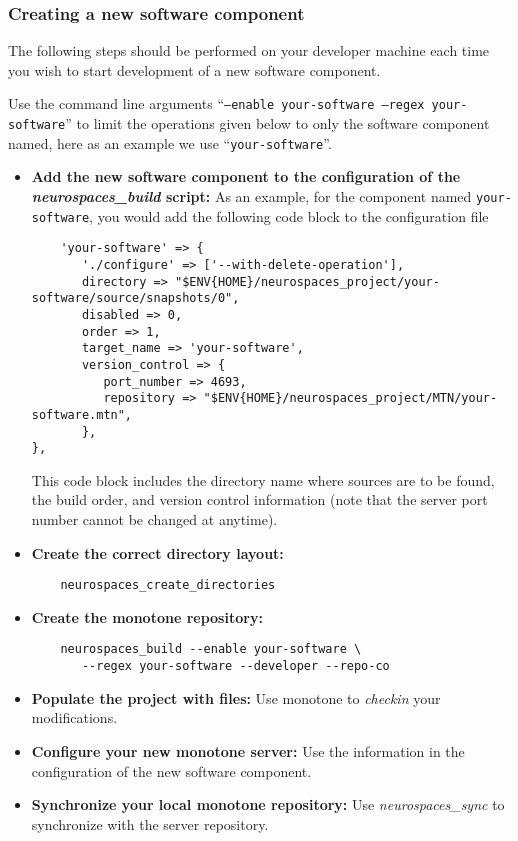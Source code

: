 \documentclass[12pt]{article}
\begin{document}
\subsubsection*{Creating a new software component}

The following steps should be performed on your developer machine each time you wish to start development of a new software component.

Use the command line arguments ``{\tt --enable your-software --regex your-software}'' to limit the operations given below to only the software component named, here as an example we use ``{\tt your-software}''. 

\begin{itemize}
	\item {\bf Add the new software component to the configuration of the {\it neurospaces\_build} script:} As an example, for the component named {\tt your-software}, you would add the following code block to the configuration file
	\begin{footnotesize}
	\begin{verbatim}
	'your-software' => {
	   './configure' => ['--with-delete-operation'],
	   directory => "$ENV{HOME}/neurospaces_project/your-software/source/snapshots/0",
	   disabled => 0,
	   order => 1,
	   target_name => 'your-software',
	   version_control => {
	      port_number => 4693,
	      repository => "$ENV{HOME}/neurospaces_project/MTN/your-software.mtn",
	   },
},
	\end{verbatim}
	\end{footnotesize}
	This code block includes the directory name where sources are to be found, the build order, and version control information 
	(note that the server port number cannot be changed at anytime).

	\item {\bf Create the correct directory layout:}
	\begin{verbatim}
	neurospaces_create_directories
	\end{verbatim}
	
	\item {\bf Create the monotone repository:}
	\begin{verbatim}
	neurospaces_build --enable your-software \
	   --regex your-software --developer --repo-co
	\end{verbatim}

	\item {\bf Populate the project with files:} Use monotone to {\it checkin} your modifications.

	\item {\bf Configure your new monotone server:} Use the information in the configuration of the new software component.
	
	\item {\bf Synchronize your local monotone repository:} Use {\it neurospaces\_sync} to synchronize with the server repository.
	
\end{itemize} 
\end{document}

